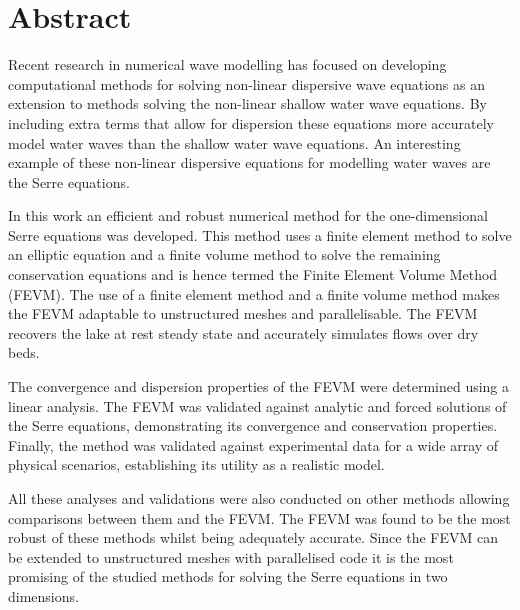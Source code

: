 \chapter*{Abstract}\label{abstract}


Recent research in numerical wave modelling has focused on developing computational methods for solving non-linear dispersive wave equations as an extension to methods solving the non-linear shallow water wave equations. By including extra terms that allow for dispersion these equations more accurately model water waves than the shallow water wave equations. An interesting example of these non-linear dispersive equations for modelling water waves are the Serre equations. 

In this work an efficient and robust numerical method for the one-dimensional Serre equations was developed. This method uses a finite element method to solve an elliptic equation and a finite volume method to solve the remaining conservation equations and is hence termed the Finite Element Volume Method (FEVM). The use of a finite element method and a finite volume method makes the FEVM adaptable to unstructured meshes and parallelisable. The FEVM recovers the lake at rest steady state and accurately simulates flows over dry beds.

The convergence and dispersion properties of the FEVM were determined using a linear analysis. The FEVM was validated against analytic and forced solutions of the Serre equations, demonstrating its convergence and conservation properties. Finally, the method was validated against experimental data for a wide array of physical scenarios, establishing its utility as a realistic model.

All these analyses and validations were also conducted on other methods allowing comparisons between them and the FEVM. The FEVM was found to be the most robust of these methods whilst being adequately accurate. Since the FEVM can be extended to unstructured meshes with parallelised code it is the most promising of the studied methods for solving the Serre equations in two dimensions.  


